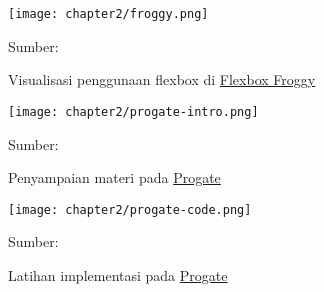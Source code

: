 
\begin{figure}[!h]
  \centering
  \texttt{[image: chapter2/froggy.png]}
  \caption{Visualisasi penggunaan flexbox di \href{https://www.flexboxfroggy.com/}{Flexbox Froggy}} \label{fig:froggy}
  Sumber: \textcite{froggy2021media}
\end{figure}


\begin{figure}[!h]
  \centering
  \texttt{[image: chapter2/progate-intro.png]}
  \caption{Penyampaian materi pada \href{https://www.progate.com/}{Progate}} \label{fig:progate-materi}
  Sumber: \textcite{progate2021media}
\end{figure}

\begin{figure}[!h]
  \centering
  \texttt{[image: chapter2/progate-code.png]}
  \caption{Latihan implementasi pada \href{https://www.progate.com/}{Progate}}\label{fig:progate-soal}
  Sumber: \textcite{progate2021media}
\end{figure}

